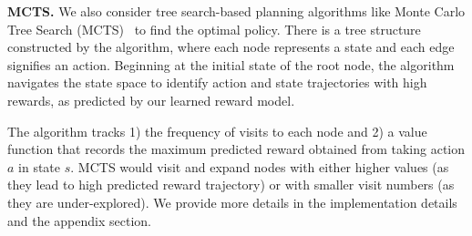\noindent\textbf{MCTS.} 
We also consider tree search-based planning algorithms like Monte Carlo Tree Search (MCTS)~\citep{coulom2006efficient,silver2017mastering} to find the optimal policy. 
There is a tree structure constructed by the algorithm, where each node represents a state and each edge signifies an action.
Beginning at the initial state of the root node, the algorithm navigates the state space to identify action and state trajectories with high rewards, as predicted by our learned reward model. 

The algorithm tracks 1) the frequency of visits to each node and 2) a value function that records the maximum predicted reward obtained from taking action ${a}$ in state ${s}$.
MCTS would visit and expand nodes with either higher values (as they lead to high predicted reward trajectory) or with smaller visit numbers (as they are under-explored).
We provide more details in the implementation details and the appendix section.


\label{sec:plan}